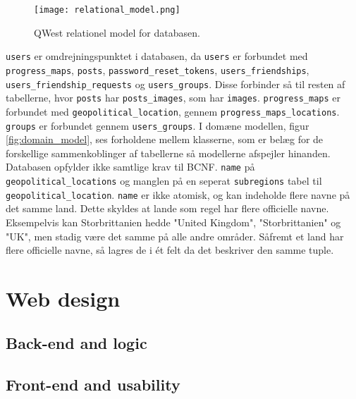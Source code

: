 \begin{figure}
    \texttt{[image: relational\_model.png]}
    \caption{QWest relationel model for databasen.}
    \label{fig:relational_model}
\end{figure}

\texttt{users} er omdrejningspunktet i databasen, da \texttt{users} er forbundet med \texttt{progress_maps}, \texttt{posts}, \texttt{password_reset_tokens}, \texttt{users_friendships}, \texttt{users_friendship_requests} og \texttt{users_groups}. Disse forbinder så til resten af tabellerne, hvor \texttt{posts} har \texttt{posts_images}, som har \texttt{images}. \texttt{progress_maps} er forbundet med \texttt{geopolitical_location}, gennem \texttt{progress_maps_locations}. \texttt{groups} er forbundet gennem \texttt{users_groups}. 
I domæne modellen, figur \ref{fig:domain_model}, ses forholdene mellem klasserne, som er belæg for de forskellige sammenkoblinger af tabellerne så modellerne afspejler hinanden. Databasen opfylder ikke samtlige krav til BCNF\cite{bcnf}. \texttt{name} på \texttt{geopolitical_locations} og manglen på en seperat \texttt{subregions} tabel til \texttt{geopolitical_location}. \texttt{name} er ikke atomisk, og kan indeholde flere navne på det samme land. Dette skyldes at lande som regel har flere officielle navne. Eksempelvis kan Storbrittanien hedde "United Kingdom", "Storbrittanien" og "UK", men stadig være det samme på alle andre områder. Såfremt et land har flere officielle navne, så lagres de i ét felt da det beskriver den samme tuple.

\section{Web design}\label{sec:webdesign}
\subsection{Back-end and logic}\label{sec:backend}
\subsection{Front-end and usability}\label{sec:frontend}
